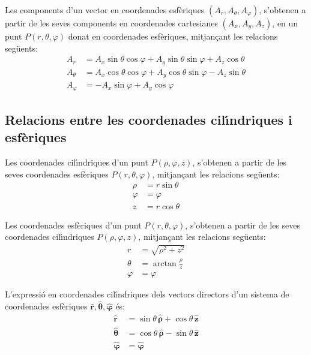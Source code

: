 \documentclass[catalan,a4paper,twoside,11pt]{article}
\begin{document}
Les components d'un vector en coordenades esf\`{e}riques $(A_r, A_\theta, A_\varphi)$, s'obtenen a partir de les seves components en coordenades cartesianes $(A_x, A_y, A_z)$, en un punt $P(r,\theta,\varphi)$ donat en coordenades esf\`{e}riques, mitjan\c{c}ant les relacions seg\"{u}ents:
\begin{subequations}\begin{align}
    A_r &=  A_x\sin\theta\cos\varphi+A_y\sin\theta\sin\varphi+A_z\cos\theta\\
    A_\theta &=  A_x\cos\theta\cos\varphi+A_y\cos\theta\sin\varphi-A_z\sin\theta\\
    A_\varphi &= -A_x\sin\varphi+A_y\cos\varphi
\end{align}\end{subequations}


\subsection{Relacions entre les coordenades cil\'{\i}ndriques i
esf\`{e}riques}

Les coordenades cil\'{\i}ndriques  d'un punt $P(\rho,\varphi,z)$,
s'obtenen a partir de les seves coordenades esf\`{e}riques
$P(r,\theta,\varphi)$, mitjan\c{c}ant les relacions seg\"{u}ents:
\begin{subequations}\begin{align}
    \rho &=r\sin\theta \\ \varphi &=\varphi \\z &=r\cos\theta
\end{align}\end{subequations}

Les coordenades  esf\`{e}riques  d'un punt $P(r,\theta,\varphi)$,
s'obtenen a partir de les seves coordenades cil\'{\i}ndriques
$P(\rho,\varphi,z)$, mitjan\c{c}ant les relacions seg\"{u}ents:
\begin{subequations}\begin{align}
    r &=\sqrt{\rho^2+z^2}\\
    \theta &=\arctan\frac{\rho}{z}\\
    \varphi &=\varphi
\end{align}\end{subequations}

L'expressi\'{o} en coordenades cil\'{\i}ndriques dels vectors directors d'un sistema de coordenades  esf\`{e}riques $\boldsymbol{\hat{r}},\boldsymbol{\hat{\theta}},\boldsymbol{\hat{\varphi}}$ \'{e}s:
\begin{subequations}\begin{align}
    \boldsymbol{\hat{r}} &=\sin\theta\,\boldsymbol{\hat{\rho}}+\cos\theta\,\boldsymbol{\hat{z}}\\
    \boldsymbol{\hat{\theta}}
    &=\cos\theta\,\boldsymbol{\hat{\rho}}-\sin\theta\,\boldsymbol{\hat{z}}\\
    \boldsymbol{\hat{\varphi}}&=\boldsymbol{\hat{\varphi}}
\end{align}\end{subequations}
\end{document}
